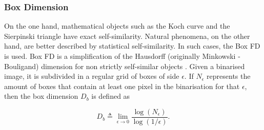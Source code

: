 %
%

\subsubsection{Box Dimension}
\label{sec:3}
On the one hand, mathematical objects such as the Koch curve and the Sierpinski triangle have exact self-similarity. Natural phenomena, on the other hand, are better described by statistical self-similarity. In such cases, the Box FD is used. Box FD is a simplification of the Hausdorff (originally Minkowski - Bouligand) dimension for non strictly self-similar objects \cite{Peitgen2004}. Given a binarised image, it is subdivided in a regular grid of boxes of side $\epsilon$. If $N_{\epsilon}$ represents the amount of boxes that contain at least one pixel in the binarisation for that $\epsilon$, then the box dimension  $D_{b}$ is defined as

\begin{equation}
D_{b} \triangleq \displaystyle\lim_{\epsilon \to 0}{\frac{\log(N_{\epsilon})}{\log (1/\epsilon)}}.
\label{eqn:1}
\end{equation}

